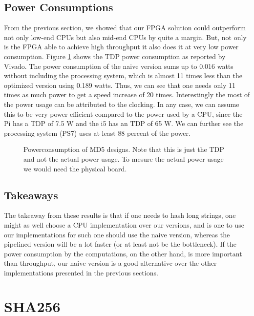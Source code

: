 \documentclass[a4paper, openany]{book}
\begin{document}
\subsection{Power Consumptions}
\label{sec:org4a845e0}
\label{sec:md5power}
From the previous section, we showed that our FPGA solution could outperform not only low-end CPUs but also mid-end CPUs by quite a margin. But, not only is the FPGA able to achieve high throughput it also does it at very low power consumption. Figure \ref{fig:md5_naive_power} shows the TDP power consumption as reported by Vivado. The power consumption of the naive version sums up to 0.016 watts without including the processing system, which is almost 11 times less than the optimized version using 0.189 watts. Thus, we can see that one needs only 11 times as much power to get a speed increase of 20 times. Interestingly the most of the power usage can be attributed to the clocking.
In any case, we can assume this to be very power efficient compared to the power used by a CPU, since the Pi has a TDP of 7.5 W and the i5 has an TDP of 65 W. We can further see the processing system (PS7) uses at least 88 percent of the power.
\begin{figure}[H]
\centering
{}
\caption[Power consumption of MD5 designs]%
{Powerconsumption of MD5 designs. Note that this is just the TDP and not the actual power usage. To mesure the actual power usage we would need the physical board.}
\label{fig:md5_naive_power}
\end{figure}
\subsection{Takeaways}
\label{sec:orgd9e4098}
The takeaway from these results is that if one needs to hash long strings, one might as well choose a CPU implementation over our versions, and is one to use our implementations for such one should use the naive version, whereas the pipelined version will be a lot faster (or at least not be the bottleneck). If the power consumption by the computations, on the other hand, is more important than throughput, our naive version is a good alternative over the other implementations presented in the previous sections.
\section{SHA256}
\label{sec:org7c8fd1f}
\label{sec:SHAperformance}
\end{document}
